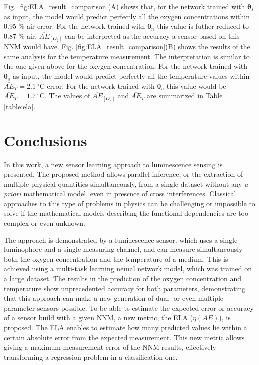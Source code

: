\documentclass[final,5p,times,twocolumn]{elsarticle}
\begin{document}
Fig. \ref{fig:ELA_result_comparison}(A) shows that, for the network trained with ${\pmb \theta}_s$ as input, the model would predict perfectly all the oxygen concentrations within 0.95 \% air error. For the network trained with ${\pmb \theta}_n$ this value is futher reduced to 0.87 \% air. $\overline{AE}_{[O_2]}$ can be interpreted as the accuracy a sensor based on this NNM  would have.
Fig. \ref{fig:ELA_result_comparison}(B) shows the results of the same analysis for the temperature measurement. The interpretation is similar to the one given above for the oxygen concentration. For the network trained with ${\pmb \theta}_s$ as input, the model would predict perfectly all the temperature values within $\overline{AE}_{T}=2.1 \ ^\circ$C error. For the network trained with ${\pmb \theta}_n$ this value would be  $\overline{AE}_{T}=1.7 \ ^\circ$C. The values of $\overline{AE}_{[O_2]}$ and $\overline{AE}_{T}$ are summarized in Table \ref{table:ela}.



\section{Conclusions}

In this work, a new sensor learning approach to luminescence sensing is presented. The proposed method allows parallel inference, or the extraction of multiple physical quantities simultaneously, from a single dataset without any {\sl a priori} mathematical model, even in presence of cross interferences. Classical approaches to this type of problems in physics can be challenging or impossible to solve if the mathematical models describing the functional dependencies are too complex or even unknown.

The approach is demonstrated by a luminescence sensor, which uses a single luminophore and a single measuring channel, and can measure simultaneously both the oxygen concentration and the temperature of a medium. This is achieved using a multi-task learning neural network model, which was trained on a large dataset. The results in the prediction of the oxygen concentration and temperature show unprecedented accuracy for both parameters, demonstrating that this approach can make a new generation of dual- or even multiple-parameter sensors possible.
To be able to estimate the expected error or accuracy of a sensor build with a given NNM, a new metric, the ELA ($\eta(AE)$), is proposed. The ELA enables to estimate how many predicted values lie within a certain absolute error from the expected measurement. This new metric allows giving a maximum measurement error of the NNM results, effectively transforming a regression problem in a classification one. 
\end{document}
